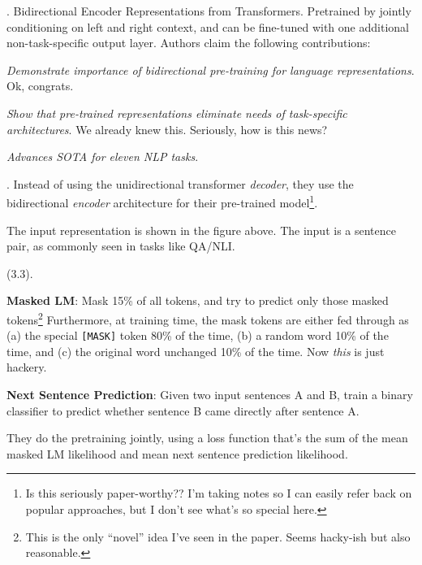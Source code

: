 \documentclass[11pt]{article}
\begin{document}
\p {}. Bidirectional Encoder Representations from Transformers. Pretrained by jointly conditioning on left and right context, and can be fine-tuned with one additional non-task-specific output layer. Authors claim the following contributions:
\begin{compactitem}
	\item \textit{Demonstrate importance of bidirectional pre-training for language representations}. Ok, congrats. 
	
	\item \textit{Show that pre-trained representations eliminate needs of task-specific architectures}. We already knew this. Seriously, how is this news?
	
	\item \textit{Advances SOTA for eleven NLP tasks}. 
\end{compactitem}

\myspace 
\p {}. Instead of using the unidirectional transformer \textit{decoder}, they use the bidirectional \textit{encoder} architecture for their pre-trained model\footnote{Is this seriously paper-worthy?? I'm taking notes so I can easily refer back on popular approaches, but I don't see what's so special here.}. 

The input representation is shown in the figure above. The input is a sentence pair, as commonly seen in tasks like QA/NLI. 

\myspace
\p {} (3.3). 
\begin{compactenum}
	\item \textbf{Masked LM}: Mask 15\% of all tokens, and try to predict only those masked tokens\footnote{This is the only ``novel'' idea I've seen in the paper. Seems hacky-ish but also reasonable.} Furthermore, at training time, the mask tokens are either fed through as (a) the special \texttt{[MASK]} token 80\% of the time, (b) a random word 10\% of the time, and (c) the original word unchanged 10\% of the time. Now \textit{this} is just hackery. 
	
	\item \textbf{Next Sentence Prediction}: Given two input sentences A and B, train a binary classifier to predict whether sentence B came directly after sentence A. 
\end{compactenum}
They do the pretraining jointly, using a loss function that's the sum of the mean masked LM likelihood and mean next sentence prediction likelihood. 
\end{document}
